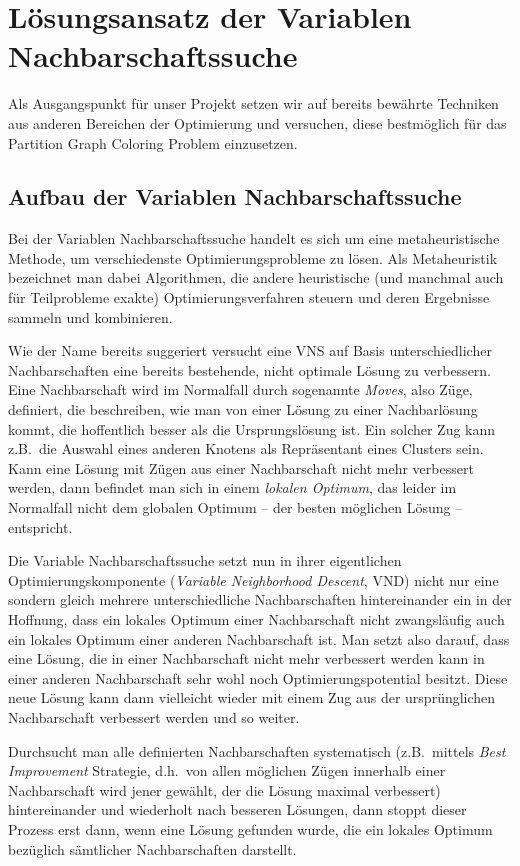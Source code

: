 \chapter{Lösungsansatz der Variablen Nachbarschaftssuche}
\label{sec:ansatz}
Als Ausgangspunkt für unser Projekt setzen wir auf bereits bewährte Techniken aus anderen Bereichen der Optimierung und versuchen, diese bestmöglich für das Partition Graph Coloring Problem einzusetzen.

\section{Aufbau der Variablen Nachbarschaftssuche}
\label{sec:vns}
Bei der Variablen Nachbarschaftssuche handelt es sich um eine metaheuristische Methode, um verschiedenste Optimierungsprobleme zu lösen. Als Metaheuristik bezeichnet man dabei Algorithmen, die andere heuristische (und manchmal auch für Teilprobleme exakte) Optimierungsverfahren steuern und deren Ergebnisse sammeln und kombinieren.

Wie der Name bereits suggeriert versucht eine VNS auf Basis unterschiedlicher Nachbarschaften eine bereits bestehende, nicht optimale Lösung zu verbessern. Eine Nachbarschaft wird im Normalfall durch sogenannte \emph{Moves}, also Züge, definiert, die beschreiben, wie man von einer Lösung zu einer Nachbarlösung kommt, die hoffentlich besser als die Ursprungslösung ist. Ein solcher Zug kann z.B.\ die Auswahl eines anderen Knotens als Repräsentant eines Clusters sein. Kann eine Lösung mit Zügen aus einer Nachbarschaft nicht mehr verbessert werden, dann befindet man sich in einem \emph{lokalen Optimum}, das leider im Normalfall nicht dem globalen Optimum -- der besten möglichen Lösung -- entspricht.

Die Variable Nachbarschaftssuche setzt nun in ihrer eigentlichen Optimierungskomponente (\emph{Variable Neighborhood Descent}, VND) nicht nur eine sondern gleich mehrere unterschiedliche Nachbarschaften hintereinander ein in der Hoffnung, dass ein lokales Optimum einer Nachbarschaft nicht zwangsläufig auch ein lokales Optimum einer anderen Nachbarschaft ist. Man setzt also darauf, dass eine Lösung, die in einer Nachbarschaft nicht mehr verbessert werden kann in einer anderen Nachbarschaft sehr wohl noch Optimierungspotential besitzt. Diese neue Lösung kann dann vielleicht wieder mit einem Zug aus der ursprünglichen Nachbarschaft verbessert werden und so weiter.

Durchsucht man alle definierten Nachbarschaften systematisch (z.B.\ mittels \emph{Best Improvement} Strategie, d.h.\ von allen möglichen Zügen innerhalb einer Nachbarschaft wird jener gewählt, der die Lösung maximal verbessert) hintereinander und wiederholt nach besseren Lösungen, dann stoppt dieser Prozess erst dann, wenn eine Lösung gefunden wurde, die ein lokales Optimum bezüglich sämtlicher Nachbarschaften darstellt.

